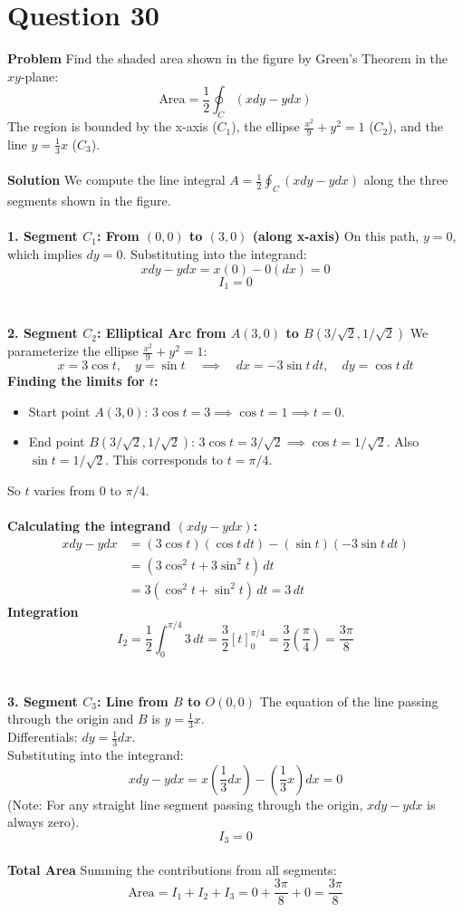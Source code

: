 \documentclass{article}
\begin{document}
\section{Question 30}
\textbf{Problem}
Find the shaded area shown in the figure  by Green's Theorem in the $xy$-plane:
\[
	\text{Area} = \frac{1}{2} \oint_C (x dy - y dx)
\]
The region is bounded by the x-axis ($C_1$), the ellipse
$\frac{x^2}{9} + y^2 = 1$ ($C_2$), and the line $y = \frac{1}{3}x$ ($C_3$).
\\
\\
\textbf{Solution}
We compute the line integral $A = \frac{1}{2} \oint_C (x dy - y dx)$ along the
three segments shown in the figure.
\\
\\
\textbf{1. Segment $C_1$: From $(0,0)$ to $(3,0)$ (along x-axis)}
On this path, $y=0$, which implies $dy=0$.
Substituting into the integrand:
\[
	x dy - y dx = x(0) - 0(dx) = 0
\]
\[ I_1 = 0 \]
\\
\\
\textbf{2. Segment $C_2$: Elliptical Arc from $A(3,0)$ to $B(3/\sqrt{2}, 1/\sqrt{2})$}
We parameterize the ellipse $\frac{x^2}{9} + y^2 = 1$:
\[
	x = 3\cos t, \quad y = \sin t \quad \implies \quad dx = -3\sin t \, dt, \quad dy = \cos t \, dt
\]
\textbf{Finding the limits for $t$:}
\begin{itemize}
	\item Start point $A(3,0)$: $3\cos t = 3 \implies \cos t = 1 \implies t = 0$.
	\item End point $B(3/\sqrt{2}, 1/\sqrt{2})$: $3\cos t = 3/\sqrt{2} \implies \cos t = 1/\sqrt{2}$. Also $\sin t = 1/\sqrt{2}$. This corresponds to $t = \pi/4$.
\end{itemize}
So $t$ varies from $0$ to $\pi/4$.
\\
\\
\textbf{Calculating the integrand $(x dy - y dx)$:}
\begin{align*}
	x dy - y dx & = (3\cos t)(\cos t \, dt) - (\sin t)(-3\sin t \, dt) \\
	            & = (3\cos^2 t + 3\sin^2 t) \, dt                      \\
	            & = 3(\cos^2 t + \sin^2 t) \, dt = 3 \, dt
\end{align*}
\textbf{Integration}
\[
	I_2 = \frac{1}{2} \int_0^{\pi/4} 3 \, dt = \frac{3}{2} [t]_0^{\pi/4} = \frac{3}{2} \left(\frac{\pi}{4}\right) = \frac{3\pi}{8}
\]
\\
\\
\textbf{3. Segment $C_3$: Line from $B$ to $O(0,0)$}
The equation of the line passing through the origin and $B$ is
$y = \frac{1}{3}x$.
\\
Differentials: $dy = \frac{1}{3}dx$.
\\
Substituting into the integrand:
\[
	x dy - y dx = x\left(\frac{1}{3}dx\right) - \left(\frac{1}{3}x\right)dx = 0
\]
(Note: For any straight line segment passing through the origin, $x dy - y dx$
is always zero).
\[ I_3 = 0 \]
\\
\textbf{Total Area}
Summing the contributions from all segments:
\[
	\text{Area} = I_1 + I_2 + I_3 = 0 + \frac{3\pi}{8} + 0 = \frac{3\pi}{8}
\]
\end{document}
